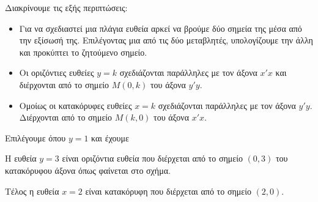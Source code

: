 \begin{Methodos}{7cm}
Διακρίνουμε τις εξής περιπτώσεις:
\begin{itemize}
\item Για να σχεδιαστεί μια πλάγια ευθεία αρκεί να βρούμε δύο σημεία της μέσα από την εξίσωσή της. Επιλέγοντας μια από τις δύο μεταβλητές, υπολογίζουμε την άλλη και προκύπτει το ζητούμενο σημείο.
\item Οι οριζόντιες ευθείες $ y=k $ σχεδιάζονται παράλληλες με τον άξονα $ x'x $ και διέρχονται από το σημείο $ M(0,k) $ του άξονα $ y'y $.
\item Ομοίως οι κατακόρυφες ευθείες $ x=k $ σχεδιάζονται παράλληλες με τον άξονα $ y'y $. Διέρχονται από το σημείο $ M(k,0) $ του άξονα $ x'x $.
\end{itemize}
\end{Methodos}
\lysh
\begin{alist}
\item Επιλέγουμε όπου $ y=1 $ και έχουμε\\
\item Η ευθεία $ y=3 $ είναι οριζόντια ευθεία που διέρχεται από το σημείο $ (0,3) $ του κατακόρυφου άξονα όπως φαίνεται στο σχήμα.
\item Τέλος η ευθεία $ x=2 $ είναι κατακόρυφη που διέρχεται από το σημείο $ (2,0) $.
\end{alist}
